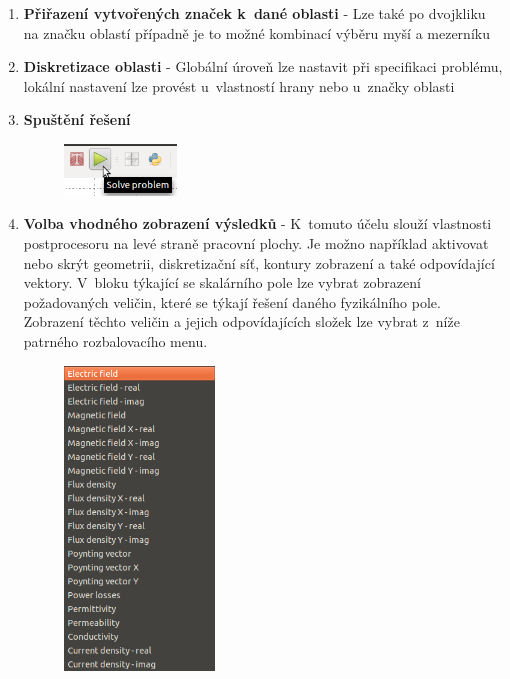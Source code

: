 \begin{enumerate}
\item {\bf Přiřazení vytvořených značek k~dané oblasti} - Lze také po dvojkliku na značku oblastí případně je to možné kombinací výběru myší a mezerníku
\item {\bf Diskretizace oblasti} - Globální úroveň lze nastavit při specifikaci problému, lokální nastavení lze provést u~vlastností hrany nebo u~značky oblasti 
\item {\bf Spuštění řešení}
\begin{figure}[!h]
	\centering
	\includegraphics[width=3cm]{sim_spusteni_reseni.png}
\end{figure}
\item {\bf Volba vhodného zobrazení výsledků} - K~tomuto účelu slouží vlastnosti postprocesoru na levé straně pracovní plochy. Je možno například aktivovat nebo skrýt geometrii, diskretizační síť, kontury zobrazení a také odpovídající vektory. V~bloku týkající se skalárního pole lze vybrat zobrazení požadovaných veličin, které se týkají řešení daného fyzikálního pole. Zobrazení těchto veličin a jejich odpovídajících složek lze vybrat z~níže patrného rozbalovacího menu.%
\begin{figure}[!h]
	\centering
	\includegraphics[width=4cm]{sim_zobrazeni.png}
	\label{obr:sim_zobrazeni}
\end{figure}
\end{enumerate}


